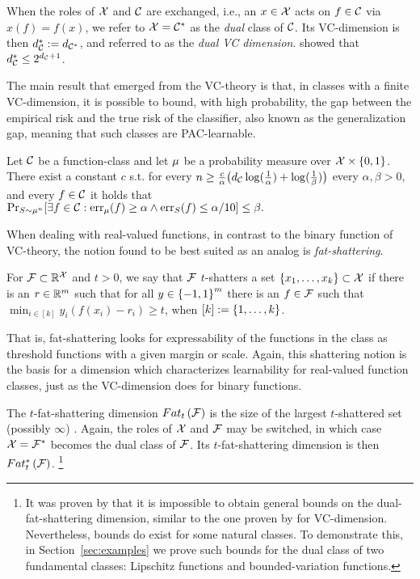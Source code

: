 \documentclass[12pt,a4paper,oneside,onecolumn]{book}
\begin{document}
When the roles of $\X$ and $\class$ are exchanged,
i.e., an $x\in\X$ acts on $f\in\class$
via
$x(f)=f(x)$, 
we refer to $\X=\class^*$ as the {\em dual} class of $\class$.
Its VC-dimension is then
$\dualvc{\class} := \vc{\class^*}$, 
and referred to as the \emph{dual VC dimension}.
\citet{MR723955} showed that 
$\dualvc{\class} \leq 2^{\vc{\class}+1}$.

The main result that emerged from the VC-theory is that, in classes with a finite VC-dimension, it is possible to bound, with high probability,  the gap between the empirical risk and the true risk of the classifier, also known as the generalization gap, meaning that such classes are PAC-learnable.


\begin{theorem}
\label{thm:vc}
Let $\class$ be a function-class 
and let $\measure$ be a probability measure over  $\domain\times\{0,1\}$. 
There exist a constant $c$ s.t.
for every 
$n \geq
\frac{c}{\alpha}\big(\vc{\class} \log(\frac{1}{\alpha}) + \log(\frac{1}{\beta})\big)$
every $\alpha, \beta > 0$, 
and every $f \in \class$ it holds that
$
  \Pr_{S\sim \measure^n}[\exists f\in\class:
  \errD{f} \geq \alpha \wedge \errS{f}{S} \leq \alpha/10] \leq \beta.
$
\end{theorem}

When dealing with real-valued functions, in contrast to the binary function of VC-theory, the notion found to be best suited as an analog is  \emph{fat-shattering}.
\begin{definition}
For $\F\subset\R^\X$ and $t>0$,
we say that $\F$ $t$-shatters
a set $\set{x_1,\ldots,x_k}\subset\X$
if
there is an $r\in\R^m$ such that for all $y\in\set{-1,1}^m$
there is an $f\in\F$ such that
$ \min_{i\in[k]} y_i(f(x_i)-r_i)\ge t$, 
when 
$[k]:=\set{1,\ldots,k}$.
\end{definition}
That is, fat-shattering looks for expressability of the functions in the class as threshold functions with a given margin or scale.
Again, this shattering notion is the basis for a dimension which characterizes learnability for real-valued function classes, just as the VC-dimension does for binary functions.
\begin{definition}
The $t$-fat-shattering dimension 
$\fat{t}{\F}$
is the size of the largest $t$-shattered set (possibly $\infty$) . 
Again, the roles of $\X$ and $\F$ may be switched, 
in which case $\X=\F^*$ becomes the dual class of $\F$.
Its $t$-fat-shattering dimension is then 
$\dualfat{t}{\F}$.
\footnote{It was proven by \citet{DBLP:journals/corr/abs-2108-10037} that it is impossible to obtain general bounds on the dual-fat-shattering dimension, similar to the one proven by \citet{MR723955} for VC-dimension. 
Nevertheless, bounds do exist for some natural classes. To demonstrate this, in Section~\ref{sec:examples} we prove such bounds for the dual class of two fundamental classes: Lipschitz functions and bounded-variation functions.}
\end{definition}
\end{document}
